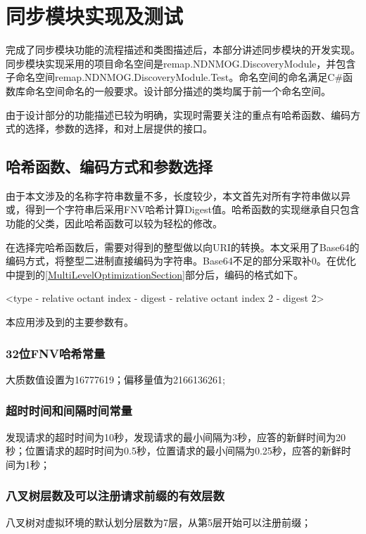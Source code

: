 \section{同步模块实现及测试}
\par
完成了同步模块功能的流程描述和类图描述后，本部分讲述同步模块的开发实现。同步模块实现采用的项目命名空间是remap.NDNMOG.DiscoveryModule，并包含子命名空间remap.NDNMOG.DiscoveryModule.Test。命名空间的命名满足C\#函数库命名空间命名的一般要求。设计部分描述的类均属于前一个命名空间。
\par
由于设计部分的功能描述已较为明确，实现时需要关注的重点有哈希函数、编码方式的选择，参数的选择，和对上层提供的接口。
\subsection{哈希函数、编码方式和参数选择}
\setcounter{subsubsection}{0}
\par
由于本文涉及的名称字符串数量不多，长度较少，本文首先对所有字符串做以异或，得到一个字符串后采用FNV哈希计算Digest值。哈希函数的实现继承自只包含功能的父类，因此哈希函数可以较为轻松的修改。
\par
在选择完哈希函数后，需要对得到的整型做以向URI的转换。本文采用了Base64的编码方式，将整型二进制直接编码为字符串。Base64不足的部分采取补0。在优化中提到的\ref{MultiLevelOptimizationSection}部分后，编码的格式如下。
\newline
\centerline{<type - relative octant index - digest - relative octant index 2 - digest 2>}
\par
本应用涉及到的主要参数有。
\subsubsection{32位FNV哈希常量}
大质数值设置为16777619；偏移量值为2166136261;
\subsubsection{超时时间和间隔时间常量}
发现请求的超时时间为10秒，发现请求的最小间隔为3秒，应答的新鲜时间为20秒；位置请求的超时时间为0.5秒，位置请求的最小间隔为0.25秒，应答的新鲜时间为1秒；
\subsubsection{八叉树层数及可以注册请求前缀的有效层数}
八叉树对虚拟环境的默认划分层数为7层，从第5层开始可以注册前缀；
